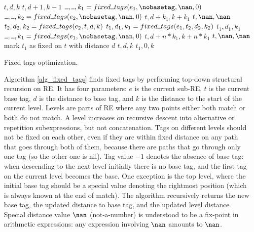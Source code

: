 \documentclass[]{article}
\let\oldnl\nl%
\newcommand{\nonl}{\renewcommand{\nl}{\let\nl\oldnl}}%
\newcommand{\Xund}{\rule{.5em}{.5pt}}
\begin{document}
\begin{algorithm}[H] \DontPrintSemicolon {} 
\small

\Indm

\nonl\Fn {$\underline{fixed \Xund tags \big( e, t, d, k \big)} \smallskip$} {
     {
        \Return $t, d, k$
    }
    \BlankLine
     {
        \Return $t, d + 1, k + 1$
    }
    \BlankLine
     {
        $\Xund, \Xund, k_1 = fixed \Xund tags(e_1, \nobasetag, \nan, 0)$ \;
        $\Xund, \Xund, k_2 = fixed \Xund tags(e_2, \nobasetag, \nan, 0)$ \;
         {
            \Return $t, d + k_1, k + k_1$
        }
        \Return $t, \nan, \nan$
    }
    \BlankLine
     {
        $t_2, d_2, k_2 = fixed \Xund tags(e_2, t, d, k)$ \;
        $t_1, d_1, k_1 = fixed \Xund tags(e_1, t_2, d_2, k_2)$ \;
        \Return $t_1, d_1, k_1$
    }
    \BlankLine
     {
        $\Xund, \Xund, k_1 = fixed \Xund tags(e_1, \nobasetag, \nan, 0)$ \;
         {
            \Return $t, d + n * k_1, k + n * k_1$
        }
        \Return $t, \nan, \nan$
    }
    \BlankLine
     {
         {
            mark $t_1$ as fixed on $t$ with distance $d$ \;
            \Return $t, d, k$
        }
        \Return $t_1, 0, k$
    }
}

\vspace{1em}
\caption{Fixed tags optimization.}\label{alg_fixed_tags}
\end{algorithm}
\vspace{2em}

Algorithm \ref{alg_fixed_tags} finds fixed tags by performing top-down structural recursion on RE.
It has four parameters: $e$ is the current sub-RE, $t$ is the current base tag,
$d$ is the distance to base tag, and $k$ is the distance to the start of the current level.
Levels are parts of RE where any two points either both match or both do not match.
A level increases on recursive descent into alternative or repetition subexpressions, but not concatenation.
Tags on different levels should not be fixed on each other, even if they are within fixed distance on any path that goes through both of them,
because there are paths that go through only one tag (so the other one is nil).
Tag value $-1$ denotes the absence of base tag: when descending to the next level initially there is no base tag, and the first tag on the current level becomes the base.
One exception is the top level, where the initial base tag should be a special value denoting the rightmost position (which is always known at the end of match).
The algorithm recursively returns the new base tag, the updated distance to base tag, and the updated level distance.
Special distance value $\nan$ (not-a-number) is understood to be a fix-point in arithmetic expressions: any expression involving $\nan$ amounts to $\nan$.
\end{document}

